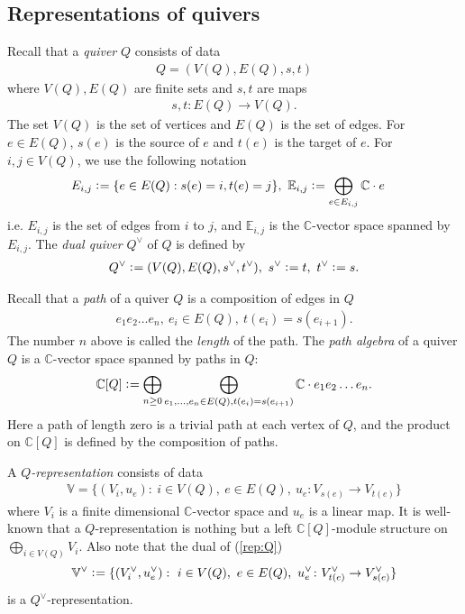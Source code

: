 \documentclass[11pt]{amsart}
\theoremstyle{plain}
\theoremstyle{definition}
\theoremstyle{remark}
\begin{document}
\subsection{Representations of quivers}
Recall that a \textit{quiver} $Q$ consists of data
\begin{align*}
Q=(V(Q), E(Q), s, t)
\end{align*}
where $V(Q), E(Q)$ are finite sets 
and $s, t$ are maps
\begin{align*}
s, t \colon E(Q) \to V(Q).
\end{align*}
The set $V(Q)$ is the set of vertices and
$E(Q)$ is the set of edges. 
For $e \in E(Q)$, 
$s(e)$ is the source of $e$
and $t(e)$ is the target of $e$. 
For $i, j \in V(Q)$, we use the following notation
\begin{align}\label{Eab}
E_{i, j} \cneq \{e \in E(Q) : 
s(e)=i, t(e)=j\}, \
\mathbb{E}_{i, j} &\cneq 
\bigoplus_{e \in E_{i, j}} \mathbb{C} \cdot e
\end{align}
i.e. $E_{i, j}$ is the set of edges 
from $i$ to $j$, 
and $\mathbb{E}_{i, j}$ is the 
$\mathbb{C}$-vector space spanned by $E_{i, j}$. 
The \textit{dual quiver} $Q^{\vee}$ of $Q$ is defined by 
\begin{align*}
Q^{\vee} \cneq (V(Q), E(Q), s^{\vee}, t^{\vee}), \ 
s^{\vee} \cneq t, \ t^{\vee} \cneq s. 
\end{align*}

Recall that a \textit{path}
of a quiver $Q$ 
is a composition of edges in $Q$
\begin{align*}
e_1 e_2 \ldots e_n, \ e_i \in E(Q), \ t(e_i)=s(e_{i+1}). 
\end{align*}
The number $n$ above is called the \textit{length} of the path. 
The \textit{path algebra} of 
a quiver $Q$ is
a $\mathbb{C}$-vector space spanned by 
paths in $Q$:
\begin{align*}
\mathbb{C}[Q] \cneq 
\bigoplus_{n\ge 0}
\bigoplus_{e_1, \ldots, e_n \in E(Q), t(e_i)=s(e_{i+1})} \mathbb{C} \cdot e_1 e_2 \ldots e_n.
\end{align*}
Here a path of length zero is a trivial path 
at each vertex of $Q$, and 
the product on $\mathbb{C}[Q]$ is defined by the 
composition of paths. 
 
A \textit{$Q$-representation} consists of
data
\begin{align}\label{rep:Q}
\mathbb{V}=\{
(V_i, u_e) : \ i \in V(Q),  \ e \in E(Q), \ 
u_e \colon V_{s(e)} \to V_{t(e)}\}
\end{align}
where $V_i$ is a finite dimensional 
$\mathbb{C}$-vector space 
and $u_e$ is a linear map. 
It is well-known that a $Q$-representation is nothing but 
a left $\mathbb{C}[Q]$-module
structure on $\bigoplus_{i \in V(Q)}V_i$. 
Also note that the dual of (\ref{rep:Q})
\begin{align}\label{V:dual}
\mathbb{V}^{\vee} \cneq \{
(V_i^{\vee}, u_e^{\vee}) : \ i \in V(Q),  \ e \in E(Q), \ 
u_e^{\vee} \colon V_{t(e)}^{\vee} \to V_{s(e)}^{\vee}\}
\end{align}
is  
a $Q^{\vee}$-representation. 
\end{document}
